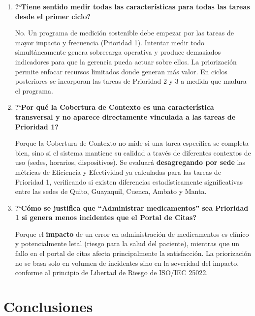 \documentclass[12pt,a4paper]{article}
\begin{document}
\begin{enumerate}
    \item \textbf{?`Tiene sentido medir todas las caracter\'isticas para todas las tareas desde el primer ciclo?}

    No. Un programa de medici\'on sostenible debe empezar por las tareas de mayor impacto y frecuencia (Prioridad 1). Intentar medir todo simult\'aneamente genera sobrecarga operativa y produce demasiados indicadores para que la gerencia pueda actuar sobre ellos. La priorizaci\'on permite enfocar recursos limitados donde generan m\'as valor. En ciclos posteriores se incorporan las tareas de Prioridad 2 y 3 a medida que madura el programa.

    \item \textbf{?`Por qu\'e la Cobertura de Contexto es una caracter\'istica transversal y no aparece directamente vinculada a las tareas de Prioridad 1?}

    Porque la Cobertura de Contexto no mide si una tarea espec\'ifica se completa bien, sino si el sistema mantiene su calidad a trav\'es de diferentes contextos de uso (sedes, horarios, dispositivos). Se evaluar\'a \textbf{desagregando por sede} las m\'etricas de Eficiencia y Efectividad ya calculadas para las tareas de Prioridad 1, verificando si existen diferencias estad\'isticamente significativas entre las sedes de Quito, Guayaquil, Cuenca, Ambato y Manta.

    \item \textbf{?`C\'omo se justifica que ``Administrar medicamentos'' sea Prioridad 1 si genera menos incidentes que el Portal de Citas?}

    Porque el \textbf{impacto} de un error en administraci\'on de medicamentos es cl\'inico y potencialmente letal (riesgo para la salud del paciente), mientras que un fallo en el portal de citas afecta principalmente la satisfacci\'on. La priorizaci\'on no se basa solo en volumen de incidentes sino en la severidad del impacto, conforme al principio de Libertad de Riesgo de ISO/IEC 25022.
\end{enumerate}

\section{Conclusiones}
\end{document}
